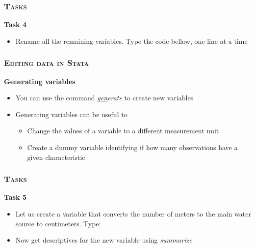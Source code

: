 \documentclass[10pt]{beamer}
\begin{document}
	\begin{frame}
		\frametitle{\textsc{Tasks}}
		\begin{center}
			\Large\textbf{Task 4}
		\end{center}
		\begin{itemize} 
			\item Rename all the remaining variables. Type the code bellow, one line at a time
		\end{itemize}
\begin{stlog}\end{stlog}
	\end{frame}
	
	\begin{frame}
		\frametitle{\textsc{Editing data in Stata}}
		\begin{center}
			\Large\textbf{Generating variables}
		\end{center}
		\begin{itemize}
			\item You can use the command \textit{\underline{gen}erate} to create new variables		
			\item Generating variables can be useful to
			\begin{itemize}
				\item Change the values of a variable to a different measurement unit
				\item Create a dummy variable identifying if how many observations have a given characteristic
			\end{itemize}
		\end{itemize}		
	\end{frame}		
	
	
	\begin{frame}
		\frametitle{\textsc{Tasks}}
		\begin{center}
			\Large\textbf{Task 5}
		\end{center}
		\begin{itemize} 
			\item Let us create a variable that converts the number of meters to the main water source to centimeters. Type:
		\end{itemize}
\begin{stlog}\end{stlog}
		\begin{itemize}
			\item Now get descriptives for the new variable using \textit{summarize}
		\end{itemize}
	\end{frame}
	
\end{document}
